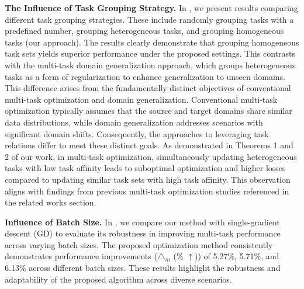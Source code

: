 \noindent\textbf{The Influence of Task Grouping Strategy.}  
In , we present results comparing different task grouping strategies. These include randomly grouping tasks with a predefined number, grouping heterogeneous tasks, and grouping homogeneous tasks (our approach). The results clearly demonstrate that grouping homogeneous task sets yields superior performance under the proposed settings. This contrasts with the multi-task domain generalization approach, which groups heterogeneous tasks as a form of regularization to enhance generalization to unseen domains. 
This difference arises from the fundamentally distinct objectives of conventional multi-task optimization and domain generalization. Conventional multi-task optimization typically assumes that the source and target domains share similar data distributions, while domain generalization addresses scenarios with significant domain shifts. Consequently, the approaches to leveraging task relations differ to meet these distinct goals. As demonstrated in Theorems 1 and 2 of our work, in multi-task optimization, simultaneously updating heterogeneous tasks with low task affinity leads to suboptimal optimization and higher losses compared to updating similar task sets with high task affinity. This observation aligns with findings from previous multi-task optimization studies referenced in the related works section.

\noindent\textbf{Influence of Batch Size.}  
In , we compare our method with single-gradient descent (GD) to evaluate its robustness in improving multi-task performance across varying batch sizes. The proposed optimization method consistently demonstrates performance improvements (\(\triangle_m\) (\% \(\uparrow\))) of 5.27\%, 5.71\%, and 6.13\% across different batch sizes. These results highlight the robustness and adaptability of the proposed algorithm across diverse scenarios.



